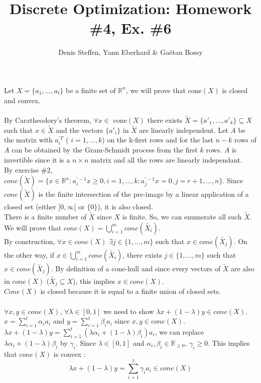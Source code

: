 \documentclass[a4paper,11pt,french]{article}
\title{Discrete Optimization: Homework \#4, Ex. \#6}
\author{Denis Steffen, Yann Eberhard \& Gaëtan Bossy}
\begin{document}
    
    \maketitle
    Let $X=\{ a_{1}, ... , a_{t}\}$ be a finite set of $\mathbb{R}^{n}$, we will prove that cone$(X)$ is closed and convex.
    \\
    \\
    By Caratheodory's theorem, $\forall x \in$ cone$(X)$ there exists $\widetilde{X}=\{ a'_{1}, ... , a'_{k}\} \subseteq X$ such that $x \in \widetilde{X}$ and the vectors $\{ a'_{i}\}$ in $\widetilde{X}$ are linearly independent. Let $A$ be the matrix with $a_{i}^{\prime T}$ ( $i=1, ... , k$) on the k-first rows and for the last $n-k$ rows of $A$ can be obtained by the Gram-Schmidt process from the first $k$ rows. $A$ is invertible since it is a $n \times n$ matrix and all the rows are linearly independant.
    \\
    By exercise \#2, $cone(\widetilde{X})=\{ x\in \mathbb{R}^{n} : a_{ i}^{\prime -1}x \geq 0, i=1, ... , k; a_{j}^{\prime -1}x = 0, j=r+1, ... , n  \}$.
    Since $cone(\widetilde{X})$ is the finite intersection of the pre-image by a linear application of a closed set (either $[0, \infty[$ or $\{0\}$), it is also closed. 
    \\
    There is a finite number of $\widetilde{X}$ since $X$ is finite. So, we can enumerate all such $\widetilde{X}$. We will prove that $cone(X)=\displaystyle{\bigcup_{ i=1}^{m}} cone(\widetilde{X_{i}})$. 
    \\
    By construction, $\forall x \in cone(X)$ $\exists j \in \{1, ..., m\}$ such that $x \in cone(\widetilde{X_{j}})$. On the other way, if $x \in \displaystyle{\bigcup_{ i=1}^{m}} cone(\widetilde{X_{i}})$, there exists $j \in \{1, ... , m \}$ such that $x \in cone(\widetilde{X_{j}})$. 
    By definition of a cone-hull and since every vectors of $\widetilde{X}$ are also in $cone(X)$ ($\widetilde{X_{j}} \subseteq X$), this implies $x \in cone(X)$.
    \\
    $Cone(X)$ is closed because it is equal to a finite union of closed sets.
    \\
    \\
    $\forall x, y \in cone(X)$, $\forall \lambda \in [0,1]$ we need to show $\lambda 
    x +(1-\lambda)y \in cone(X)$. $x=\displaystyle{\sum_{i=1}^{t}} \alpha_{i} a_{i}$ and $y=\displaystyle{\sum_{i=1}^{t}} \beta_{i} a_{i}$ since $x,y \in cone(X)$.
    \\
    $\lambda x +(1-\lambda)y = \displaystyle{\sum_{i=1}^{t}} (\lambda \alpha_{i} + (1-\lambda)\beta_{i}) a_{i}$, we can replace $\lambda \alpha_{i} + (1-\lambda)\beta_{i}$ by $\gamma_{i}$. Since $\lambda \in [0,1]$ and $\alpha_{i}, \beta_{i} \in \mathbb{R}_{\geq 0}$, $\gamma_{i} \geq 0$. This implies that $cone(X)$ is convex :
    \begin{equation*}
    \lambda x +(1-\lambda)y = \displaystyle{\sum_{i=1}^{t}} \gamma_{i} a_{i} \in cone(X)
    \end{equation*}
    
    
    
\end{document}
